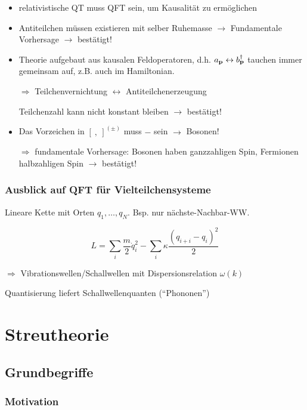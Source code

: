\documentclass[11pt,a4paper]{report}
\begin{document}
\begin{itemize}
\begin{itemize}
\item relativistische QT muss QFT sein, um Kausalität zu ermöglichen
\item Antiteilchen müssen existieren mit selber Ruhemasse $\rightarrow$ Fundamentale Vorhersage $\rightarrow$ bestätigt!
\item Theorie aufgebaut aus kausalen Feldoperatoren, d.h. $a_{\mathbf{p}}\leftrightarrow b^\dagger_{\mathbf{p}}$ tauchen immer gemeinsam auf, z.B. auch im Hamiltonian.\par 
$\Rightarrow$ Teilchenvernichtung $\leftrightarrow$ Antiteilchenerzeugung\par 
Teilchenzahl kann nicht konstant bleiben $\rightarrow$ bestätigt!
\item Das Vorzeichen in $[\: ,\:]^{(\pm )}$ muss $-$ sein $\rightarrow$ Bosonen!\par 
$\Rightarrow$ fundamentale Vorhersage: Bosonen haben ganzzahligen Spin, Fermionen halbzahligen Spin $\rightarrow$ bestätigt!
\end{itemize}

\end{itemize}

\subsection{Ausblick auf QFT für Vielteilchensysteme}

Lineare Kette mit Orten $q_1,\ldots ,q_N$. Bsp. nur nächste-Nachbar-WW.

$$L=\sum_i \frac{m}{2}\dot{q}_i^2 - \sum_i\kappa \frac{(q_{i+i}-q_i)^2}{2}$$

$\Rightarrow$ Vibrationswellen/Schallwellen mit Dispersionsrelation $\omega (k)$\par 

Quantisierung liefert Schallwellenquanten (``Phononen'')


\chapter{Streutheorie}

\section{Grundbegriffe}

\subsection{Motivation}
\end{document}
